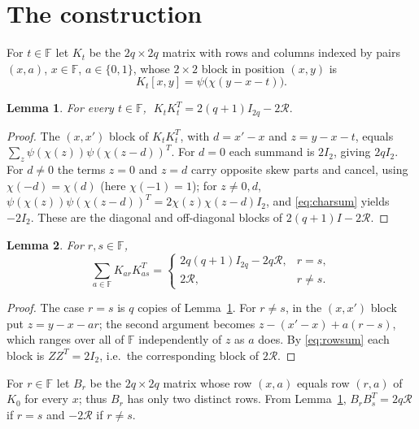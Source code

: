 \documentclass[11pt]{article}
\newtheorem{lemma}{Lemma}
\newcommand{\F}{\mathbb F}
\newcommand{\Rcal}{\mathcal R}
\begin{document}
\section{The construction}

For \(t\in\F\) let \(K_t\) be the \(2q\times2q\) matrix with rows and
columns indexed by pairs \((x,a)\), \(x\in\F\), \(a\in\{0,1\}\), whose
\(2\times2\) block in position \((x,y)\) is
\[
        K_t[x,y]=\psi\bigl(\chi(y-x-t)\bigr).
\]

\begin{lemma}\label{lem:self}
For every \(t\in\F\), \(\;K_tK_t^{T}=2(q+1)I_{2q}-2\Rcal.\)
\end{lemma}

\begin{proof}
The \((x,x')\) block of \(K_tK_t^{T}\), with \(d=x'-x\) and
\(z=y-x-t\), equals \(\sum_{z}\psi(\chi(z))\psi(\chi(z-d))^{T}\).  For
\(d=0\) each summand is \(2I_2\), giving \(2qI_2\).  For \(d\neq0\) the
terms \(z=0\) and \(z=d\) carry opposite skew parts and cancel, using
\(\chi(-d)=\chi(d)\) (here \(\chi(-1)=1\)); for \(z\neq0,d\),
\(\psi(\chi(z))\psi(\chi(z-d))^{T}=2\chi(z)\chi(z-d)I_2\), and
\eqref{eq:charsum} yields \(-2I_2\).  These are the diagonal and
off-diagonal blocks of \(2(q+1)I-2\Rcal\).
\end{proof}

\begin{lemma}\label{lem:cross}
For \(r,s\in\F\),
\[
        \sum_{a\in\F}K_{ar}K_{as}^{T}=
        \begin{cases}
        2q(q+1)I_{2q}-2q\Rcal,&r=s,\\
        2\Rcal,&r\neq s.
        \end{cases}
\]
\end{lemma}

\begin{proof}
The case \(r=s\) is \(q\) copies of Lemma~\ref{lem:self}.  For
\(r\neq s\), in the \((x,x')\) block put \(z=y-x-ar\); the second
argument becomes \(z-(x'-x)+a(r-s)\), which ranges over all of \(\F\)
independently of \(z\) as \(a\) does.  By \eqref{eq:rowsum} each block is
\(Z Z^{T}=2I_2\), i.e.\ the corresponding block of \(2\Rcal\).
\end{proof}

For \(r\in\F\) let \(B_r\) be the \(2q\times2q\) matrix whose row
\((x,a)\) equals row \((r,a)\) of \(K_0\) for every \(x\); thus \(B_r\)
has only two distinct rows.  From Lemma~\ref{lem:self},
\(B_rB_s^{T}=2q\Rcal\) if \(r=s\) and \(-2\Rcal\) if \(r\neq s\).
\end{document}
